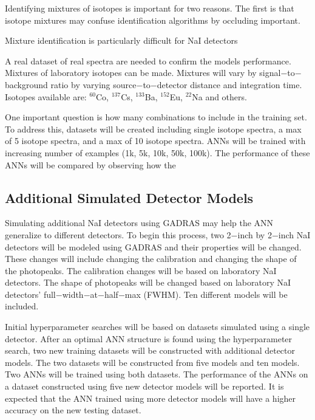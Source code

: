 \documentclass[tocnosub,noragright,centerchapter,12pt,fullpage]{uiucecethesis09}
\begin{document}
Identifying mixtures of isotopes is important for two reasons. The first is that isotope mixtures may confuse identification algorithms by occluding important.

Mixture identification is particularly difficult for NaI detectors 

A real dataset of real spectra are needed to confirm the models performance. Mixtures of laboratory isotopes can be made. Mixtures will vary by signal$-$to$-$background ratio by varying source$-$to$-$detector distance and integration time. Isotopes available are: $^{60}$Co, $^{137}$Cs, $^{133}$Ba, $^{152}$Eu, $^{22}$Na and others. %



One important question is how many combinations to include in the training set. To address this, datasets will be created including single isotope spectra, a max of 5 isotope spectra, and a max of 10 isotope spectra. ANNs will be trained with increasing number of examples (1k, 5k, 10k, 50k, 100k). The performance of these ANNs will be compared by observing how the 

\fi

\subsection{Additional Simulated Detector Models}

Simulating additional NaI detectors using GADRAS may help the ANN generalize to different detectors. To begin this process, two 2$-$inch by 2$-$inch NaI detectors will be modeled using GADRAS and their properties will be changed. These changes will include changing the calibration and changing the shape of the photopeaks. The calibration changes will be based on laboratory NaI detectors. The shape of photopeaks will be changed based on laboratory NaI detectors' full$-$width$-$at$-$half$-$max (FWHM). Ten different models will be included. 

Initial hyperparameter searches will be based on datasets simulated using a single detector. After an optimal ANN structure is found using the hyperparameter search, two new training datasets will be constructed with additional detector models. The two datasets will be constructed from five models and ten models. Two ANNs will be trained using both datasets. The performance of the ANNs on a dataset constructed using five new detector models will be reported. It is expected that the ANN trained using more detector models will have a higher accuracy on the new testing dataset. 
\end{document}
